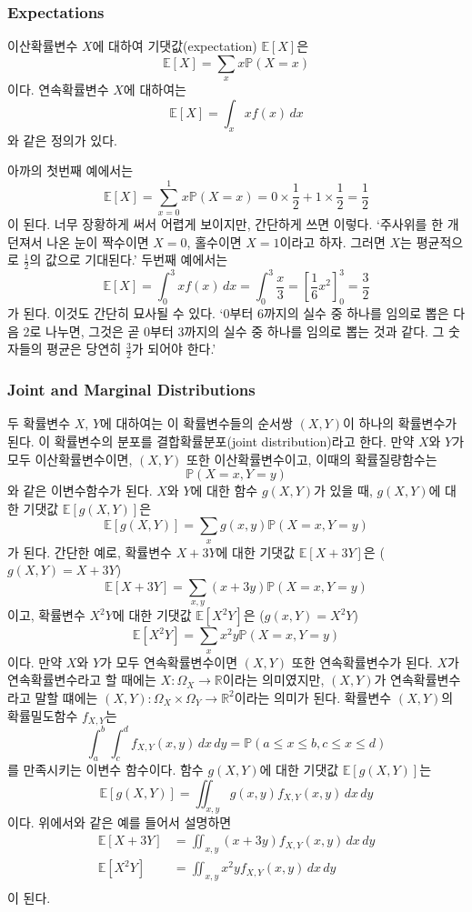 \documentclass{article}
\begin{document}
%
\subsubsection{Expectations}
이산확률변수 \(X\)에 대하여 기댓값(expectation) \(\mathbb E[X]\)은
\[\mathbb E[X]=\sum_xx\mathbb P(X=x)\]
이다.
연속확률변수 \(X\)에 대하여는
\[\mathbb E[X]=\int_xxf(x)\,dx\]
와 같은 정의가 있다.

아까의 첫번째 예에서는
\[\mathbb E[X]=\sum_{x=0}^1x\mathbb P(X=x)=0\times\frac12+1\times\frac12=\frac12\]
이 된다.
너무 장황하게 써서 어렵게 보이지만, 간단하게 쓰면 이렇다.
`주사위를 한 개 던져서 나온 눈이 짝수이면 \(X=0\), 홀수이면 \(X=1\)이라고 하자.
그러면 \(X\)는 평균적으로 \(\frac12\)의 값으로 기대된다.'
두번째 예에서는
\[\mathbb E[X]=\int_0^3xf(x)\,dx=\int_0^3\frac x3=\left[\frac16x^2\right]_0^3=\frac32\]
가 된다.
이것도 간단히 묘사될 수 있다.
`0부터 6까지의 실수 중 하나를 임의로 뽑은 다음 2로 나누면, 그것은 곧 0부터 3까지의 실수 중 하나를 임의로 뽑는 것과 같다.
그 숫자들의 평균은 당연히 \(\frac32\)가 되어야 한다.'

%
\subsubsection{Joint and Marginal Distributions}
두 확률변수 \(X\), \(Y\)에 대하여는 이 확률변수들의 순서쌍 \((X,Y)\)이 하나의 확률변수가 된다.
이 확률변수의 분포를 결합확률분포(joint distribution)라고 한다.
만약 \(X\)와 \(Y\)가 모두 이산확률변수이면, \((X,Y)\) 또한 이산확률변수이고, 이때의 확률질량함수는
\[\mathbb P(X=x, Y=y)\]
와 같은 이변수함수가 된다.
\(X\)와 \(Y\)에 대한 함수 \(g(X,Y)\)가 있을 때, \(g(X,Y)\)에 대한 기댓값 \(\mathbb E[g(X,Y)]\)은
\[\mathbb E[g(X,Y)]=\sum_xg(x,y)\mathbb P(X=x,Y=y)\]
가 된다.
간단한 예로, 확률변수 \(X+3Y\)에 대한 기댓값 \(\mathbb E[X+3Y]\)은 (\(g(X,Y)=X+3Y\))
\[\mathbb E[X+3Y]=\sum_{x,y}(x+3y)\mathbb P(X=x,Y=y)\]
이고, 확률변수 \(X^2Y\)에 대한 기댓값 \(\mathbb E[X^2Y]\)은 (\(g(x,Y)=X^2Y\))
\[\mathbb E[X^2Y]=\sum_xx^2y\mathbb P(X=x,Y=y)\]
이다.
만약 \(X\)와 \(Y\)가 모두 연속확률변수이면 \((X,Y)\) 또한 연속확률변수가 된다.
\(X\)가 연속확률변수라고 할 때에는 \(X:\Omega_X\to\mathbb R\)이라는 의미였지만, \((X,Y)\)가 연속확률변수라고 말할 떄에는 \((X,Y):\Omega_X\times\Omega_Y\to\mathbb R^2\)이라는 의미가 된다.
확률변수 \((X,Y)\)의 확률밀도함수 \(f_{X,Y}\)는
\[\int_a^b\int_c^df_{X,Y}(x,y)\,dx\,dy=\mathbb P(a\le x\le b,c\le x\le d)\]
를 만족시키는 이변수 함수이다.
함수 \(g(X,Y)\)에 대한 기댓값 \(\mathbb E[g(X,Y)]\)는
\[\mathbb E[g(X,Y)]=\iint_{x,y}g(x,y)f_{X,Y}(x,y)\,dx\,dy\]
이다.
위에서와 같은 예를 들어서 설명하면
\begin{align*}
\mathbb E[X+3Y]&=\iint_{x,y}(x+3y)f_{X,Y}(x,y)\,dx\,dy\\
\mathbb E[X^2Y]&=\iint_{x,y}x^2yf_{X,Y}(x,y)\,dx\,dy\\
\end{align*}
이 된다.
\end{document}
